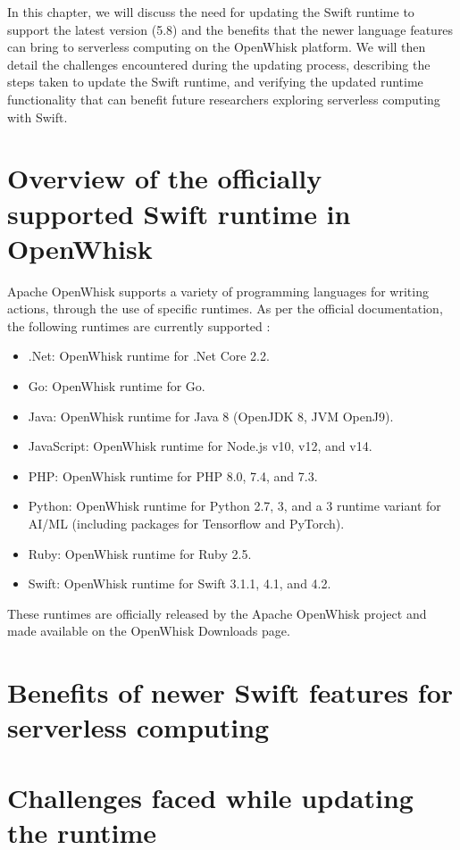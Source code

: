 In this chapter, we will discuss the need for updating the Swift runtime to support the latest version (5.8) and the benefits that the newer language features can bring to serverless computing on the OpenWhisk platform. We will then detail the challenges encountered during the updating process, describing the steps taken to update the Swift runtime, and verifying the updated runtime functionality that can benefit future researchers exploring serverless computing with Swift.

\section{Overview of the officially supported Swift runtime in OpenWhisk}
Apache OpenWhisk supports a variety of programming languages for writing actions, through the use of specific runtimes. As per the official documentation, the following runtimes are currently supported \cite{openwhisk2023}:

\begin{itemize}
\item .Net: OpenWhisk runtime for .Net Core 2.2.
\item Go: OpenWhisk runtime for Go.
\item Java: OpenWhisk runtime for Java 8 (OpenJDK 8, JVM OpenJ9).
\item JavaScript: OpenWhisk runtime for Node.js v10, v12, and v14.
\item PHP: OpenWhisk runtime for PHP 8.0, 7.4, and 7.3.
\item Python: OpenWhisk runtime for Python 2.7, 3, and a 3 runtime variant for AI/ML (including packages for Tensorflow and PyTorch).
\item Ruby: OpenWhisk runtime for Ruby 2.5.
\item Swift: OpenWhisk runtime for Swift 3.1.1, 4.1, and 4.2.
\end{itemize}

These runtimes are officially released by the Apache OpenWhisk project and made available on the OpenWhisk Downloads page.

\section{Benefits of newer Swift features for serverless computing}

\section{Challenges faced while updating the runtime}

